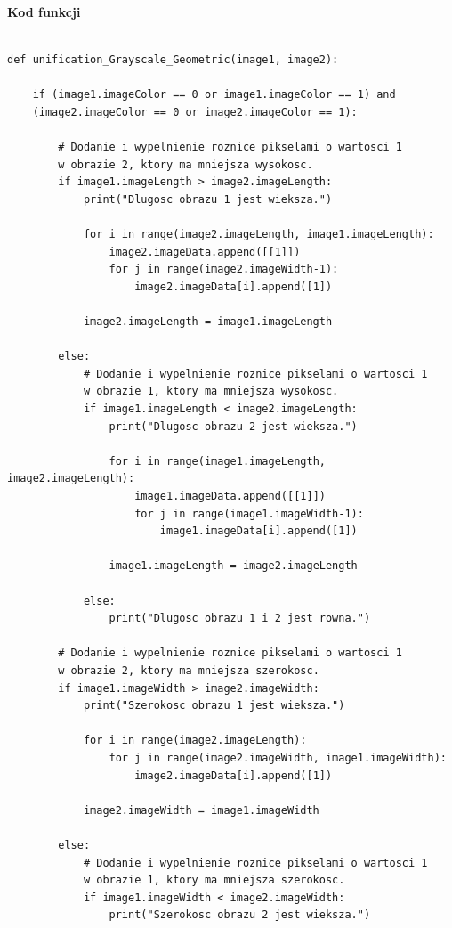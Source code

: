 \documentclass[magisterska,openany]{pracadypl}
\begin{document}
\newpage
\textbf{\Large Kod funkcji}
   
\lstset{language=Python}
\vspace{0.25cm}
\begin{lstlisting}[caption={Geometryczne ujednolicanie obrazów szarych}]

def unification_Grayscale_Geometric(image1, image2):

    if (image1.imageColor == 0 or image1.imageColor == 1) and 
    (image2.imageColor == 0 or image2.imageColor == 1):

        # Dodanie i wypelnienie roznice pikselami o wartosci 1 
        w obrazie 2, ktory ma mniejsza wysokosc.
        if image1.imageLength > image2.imageLength:
            print("Dlugosc obrazu 1 jest wieksza.")

            for i in range(image2.imageLength, image1.imageLength):
                image2.imageData.append([[1]])
                for j in range(image2.imageWidth-1):
                    image2.imageData[i].append([1])

            image2.imageLength = image1.imageLength

        else:
            # Dodanie i wypelnienie roznice pikselami o wartosci 1 
            w obrazie 1, ktory ma mniejsza wysokosc.
            if image1.imageLength < image2.imageLength:
                print("Dlugosc obrazu 2 jest wieksza.")

                for i in range(image1.imageLength, image2.imageLength):
                    image1.imageData.append([[1]])
                    for j in range(image1.imageWidth-1):
                        image1.imageData[i].append([1])

                image1.imageLength = image2.imageLength

            else:
                print("Dlugosc obrazu 1 i 2 jest rowna.")

        # Dodanie i wypelnienie roznice pikselami o wartosci 1 
        w obrazie 2, ktory ma mniejsza szerokosc.
        if image1.imageWidth > image2.imageWidth:
            print("Szerokosc obrazu 1 jest wieksza.")

            for i in range(image2.imageLength):
                for j in range(image2.imageWidth, image1.imageWidth):
                    image2.imageData[i].append([1])

            image2.imageWidth = image1.imageWidth

        else:
            # Dodanie i wypelnienie roznice pikselami o wartosci 1 
            w obrazie 1, ktory ma mniejsza szerokosc.
            if image1.imageWidth < image2.imageWidth:
                print("Szerokosc obrazu 2 jest wieksza.")


\end{lstlisting}
\end{document}

